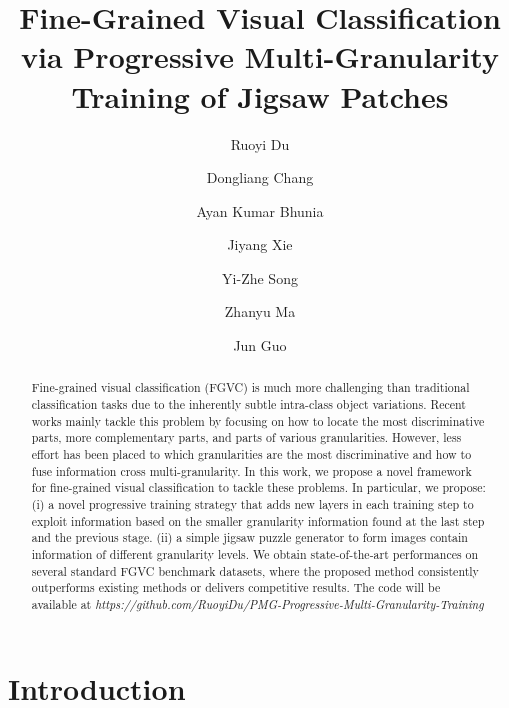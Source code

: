 \documentclass{llncs}
\begin{document}
\title{Fine-Grained Visual Classification via Progressive Multi-Granularity Training of Jigsaw Patches}
\author{Ruoyi Du \and
Dongliang Chang \and
Ayan Kumar Bhunia \and
Jiyang Xie \and
Yi-Zhe Song \and
Zhanyu Ma \and
Jun Guo}


\maketitle              

\begin{abstract}
Fine-grained visual classiﬁcation (FGVC) is much more challenging than traditional classiﬁcation tasks due to the inherently subtle intra-class object variations. Recent works mainly tackle this problem by focusing on how to locate the most discriminative parts, more complementary parts, and parts of various granularities. However, less effort has been placed to which granularities are the most discriminative and how to fuse information cross multi-granularity. In this work, we propose a novel framework for fine-grained visual classiﬁcation to tackle these problems. In particular, we propose: (i) a novel progressive training strategy that adds new layers in each training step to exploit information based on the smaller granularity information found at the last step and the previous stage. (ii) a simple jigsaw puzzle generator to form images contain information of different granularity levels. We obtain state-of-the-art performances on several standard FGVC benchmark datasets, where the proposed method consistently outperforms existing methods or delivers competitive results. The code will be available at \textit{https://github.com/RuoyiDu/PMG-Progressive-Multi-Granularity-Training}
\end{abstract}

\newpage
\section{Introduction}
\end{document}
